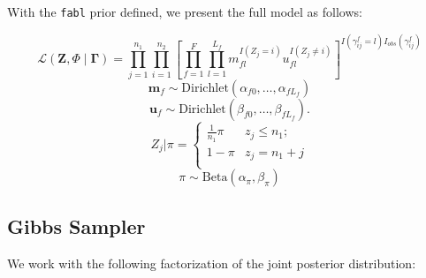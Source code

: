 \documentclass[ba]{imsart}
\begin{document}

%

With the \texttt{fabl} prior defined, we present the full model as follows: 

$$\mathcal{L}(\bm{Z}, \Phi \mid \bm{\Gamma}) = \prod_{j=1}^{n_1}  \prod_{i=1}^{n_2}\left[ \prod_{f=1}^{F}\prod_{l=1}^{L_f} m_{fl}^{I(Z_j = i)}u_{fl}^{I(Z_j \neq i)}\right]^{I(\gamma_{ij}^f = l)I_{obs}(\gamma_{ij}^f)}$$
$$\bm{m}_f \sim \text{Dirichlet}(\alpha_{f0}, \ldots, \alpha_{f L_f})$$
$$\bm{u}_f \sim \text{Dirichlet}(\beta_{f0}, \ldots, \beta_{f L_f}).$$
$$Z_j | \pi =
\begin{cases} 
	\frac{1}{n_1}\pi  & z_j \leq n_1; \\
	1-\pi &  z_j  = n_1 + j \\
\end{cases}$$
$$\pi \sim \text{Beta}(\alpha_{\pi}, \beta_{\pi})$$

\hypertarget{posterior-sampling}{%
	\subsection{Gibbs Sampler}
	\label{gibbs_sampling}}
We work with the following factorization of the joint posterior distribution:
\end{document}
